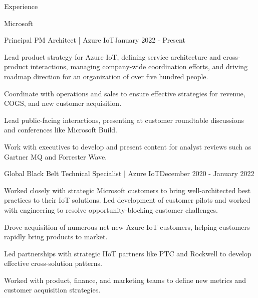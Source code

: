 \documentclass{resume} %
\begin{document}
\begin{rSection}{Experience}


\begin{rSubsection}{Microsoft}{}{}


    \begin{rSubSubsection}{Principal PM Architect | Azure IoT}{January 2022 - Present}{}{} 

        \item Lead product strategy for Azure IoT, defining service architecture and cross-product interactions,  managing company-wide coordination efforts, and driving roadmap direction for an organization of over five hundred people.
        \item Coordinate with operations and sales to ensure effective strategies for revenue, COGS, and new customer acquisition.
        \item Lead public-facing interactions, presenting at customer roundtable discussions and conferences like Microsoft Build.
        \item Work with executives to develop and present content for analyst reviews such as Gartner MQ and Forrester Wave.
        
    \end{rSubSubsection}


    \begin{rSubSubsection}{Global Black Belt Technical Specialist | Azure IoT}{December 2020 - January 2022}{}{} 

        \item Worked closely with strategic Microsoft customers to bring well-architected best practices to their IoT solutions. Led development of customer pilots and worked with engineering to resolve opportunity-blocking customer challenges.  
        \item Drove acquisition of numerous net-new Azure IoT customers, helping customers rapidly bring products to market.
        \item Led partnerships with strategic IIoT partners like PTC and Rockwell to develop effective cross-solution patterns.
        \item Worked with product, finance, and marketing teams to define new metrics and customer acquisition strategies.
    

\end{rSubSubsection}
\end{rSubsection}
\end{rSection}
\end{document}
